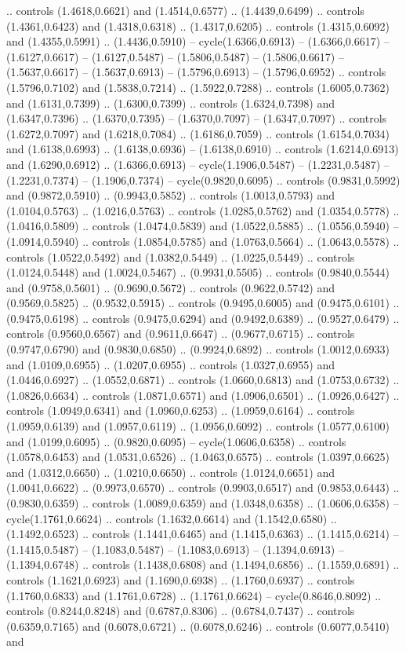 .. controls (1.4618,0.6621) and (1.4514,0.6577) .. (1.4439,0.6499) .. controls (1.4361,0.6423) and (1.4318,0.6318) .. (1.4317,0.6205) .. controls (1.4315,0.6092) and (1.4355,0.5991) .. (1.4436,0.5910) -- cycle(1.6366,0.6913) -- (1.6366,0.6617) -- (1.6127,0.6617) -- (1.6127,0.5487) -- (1.5806,0.5487) -- (1.5806,0.6617) -- (1.5637,0.6617) -- (1.5637,0.6913) -- (1.5796,0.6913) -- (1.5796,0.6952) .. controls (1.5796,0.7102) and (1.5838,0.7214) .. (1.5922,0.7288) .. controls (1.6005,0.7362) and (1.6131,0.7399) .. (1.6300,0.7399) .. controls (1.6324,0.7398) and (1.6347,0.7396) .. (1.6370,0.7395) -- (1.6370,0.7097) -- (1.6347,0.7097) .. controls (1.6272,0.7097) and (1.6218,0.7084) .. (1.6186,0.7059) .. controls (1.6154,0.7034) and (1.6138,0.6993) .. (1.6138,0.6936) -- (1.6138,0.6910) .. controls (1.6214,0.6913) and (1.6290,0.6912) .. (1.6366,0.6913) -- cycle(1.1906,0.5487) -- (1.2231,0.5487) -- (1.2231,0.7374) -- (1.1906,0.7374) -- cycle(0.9820,0.6095) .. controls (0.9831,0.5992) and (0.9872,0.5910) .. (0.9943,0.5852) .. controls (1.0013,0.5793) and (1.0104,0.5763) .. (1.0216,0.5763) .. controls (1.0285,0.5762) and (1.0354,0.5778) .. (1.0416,0.5809) .. controls (1.0474,0.5839) and (1.0522,0.5885) .. (1.0556,0.5940) -- (1.0914,0.5940) .. controls (1.0854,0.5785) and (1.0763,0.5664) .. (1.0643,0.5578) .. controls (1.0522,0.5492) and (1.0382,0.5449) .. (1.0225,0.5449) .. controls (1.0124,0.5448) and (1.0024,0.5467) .. (0.9931,0.5505) .. controls (0.9840,0.5544) and (0.9758,0.5601) .. (0.9690,0.5672) .. controls (0.9622,0.5742) and (0.9569,0.5825) .. (0.9532,0.5915) .. controls (0.9495,0.6005) and (0.9475,0.6101) .. (0.9475,0.6198) .. controls (0.9475,0.6294) and (0.9492,0.6389) .. (0.9527,0.6479) .. controls (0.9560,0.6567) and (0.9611,0.6647) .. (0.9677,0.6715) .. controls (0.9747,0.6790) and (0.9830,0.6850) .. (0.9924,0.6892) .. controls (1.0012,0.6933) and (1.0109,0.6955) .. (1.0207,0.6955) .. controls (1.0327,0.6955) and (1.0446,0.6927) .. (1.0552,0.6871) .. controls (1.0660,0.6813) and (1.0753,0.6732) .. (1.0826,0.6634) .. controls (1.0871,0.6571) and (1.0906,0.6501) .. (1.0926,0.6427) .. controls (1.0949,0.6341) and (1.0960,0.6253) .. (1.0959,0.6164) .. controls (1.0959,0.6139) and (1.0957,0.6119) .. (1.0956,0.6092) .. controls (1.0577,0.6100) and (1.0199,0.6095) .. (0.9820,0.6095) -- cycle(1.0606,0.6358) .. controls (1.0578,0.6453) and (1.0531,0.6526) .. (1.0463,0.6575) .. controls (1.0397,0.6625) and (1.0312,0.6650) .. (1.0210,0.6650) .. controls (1.0124,0.6651) and (1.0041,0.6622) .. (0.9973,0.6570) .. controls (0.9903,0.6517) and (0.9853,0.6443) .. (0.9830,0.6359) .. controls (1.0089,0.6359) and (1.0348,0.6358) .. (1.0606,0.6358) -- cycle(1.1761,0.6624) .. controls (1.1632,0.6614) and (1.1542,0.6580) .. (1.1492,0.6523) .. controls (1.1441,0.6465) and (1.1415,0.6363) .. (1.1415,0.6214) -- (1.1415,0.5487) -- (1.1083,0.5487) -- (1.1083,0.6913) -- (1.1394,0.6913) -- (1.1394,0.6748) .. controls (1.1438,0.6808) and (1.1494,0.6856) .. (1.1559,0.6891) .. controls (1.1621,0.6923) and (1.1690,0.6938) .. (1.1760,0.6937) .. controls (1.1760,0.6833) and (1.1761,0.6728) .. (1.1761,0.6624) -- cycle(0.8646,0.8092) .. controls (0.8244,0.8248) and (0.6787,0.8306) .. (0.6784,0.7437) .. controls (0.6359,0.7165) and (0.6078,0.6721) .. (0.6078,0.6246) .. controls (0.6077,0.5410) and 
